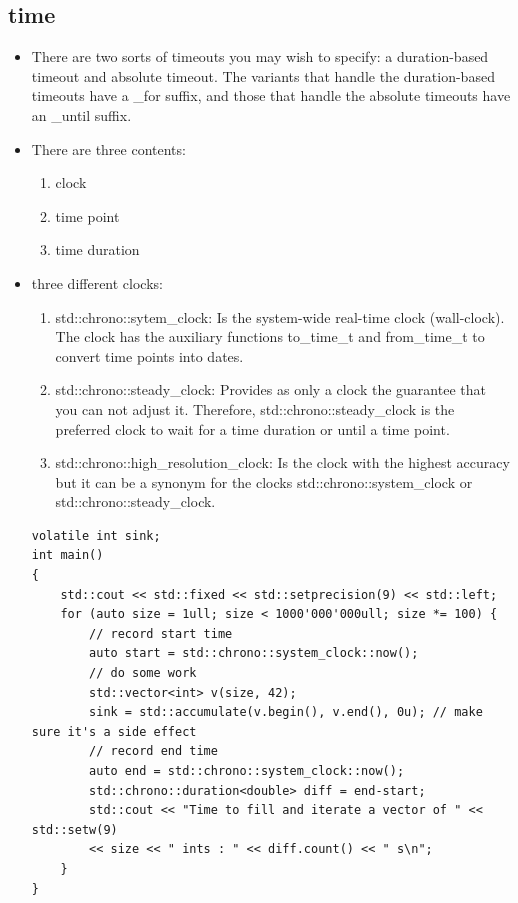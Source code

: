 \documentclass[a4paper,11pt,twoside]{book}
\begin{document}
\subsection{time}
\begin{itemize}
	\item There are two sorts of timeouts you may wish to specify: a duration-based timeout and absolute timeout. The variants that handle the duration-based timeouts have a \_for suffix, and those that handle the absolute timeouts have an \_until suffix.
	
	\item There are three contents:
	\begin{enumerate}
		\item clock
		\item time point
		\item time duration
	\end{enumerate}

	\item three different clocks:
	\begin{enumerate}
		\item std::chrono::sytem\_clock: Is the system-wide real-time clock (wall-clock). The clock has the auxiliary functions to\_time\_t and from\_time\_t to convert time points into dates.
		
		\item std::chrono::steady\_clock:  Provides as only a clock the guarantee that you can not adjust it. Therefore, std::chrono::steady\_clock is the preferred clock to wait for a time duration or until a time point.
		
		\item std::chrono::high\_resolution\_clock: Is the clock with the highest accuracy but it can be a synonym for the clocks std::chrono::system\_clock or std::chrono::steady\_clock.
	\end{enumerate}

\begin{lstlisting}[numbers=none]
volatile int sink;
int main()
{
	std::cout << std::fixed << std::setprecision(9) << std::left;
	for (auto size = 1ull; size < 1000'000'000ull; size *= 100) {
		// record start time
		auto start = std::chrono::system_clock::now();
		// do some work
		std::vector<int> v(size, 42);
		sink = std::accumulate(v.begin(), v.end(), 0u); // make sure it's a side effect
		// record end time
		auto end = std::chrono::system_clock::now();
		std::chrono::duration<double> diff = end-start;
		std::cout << "Time to fill and iterate a vector of " << std::setw(9)
		<< size << " ints : " << diff.count() << " s\n";
	}
}
\end{lstlisting}


\end{itemize}
\end{document}
